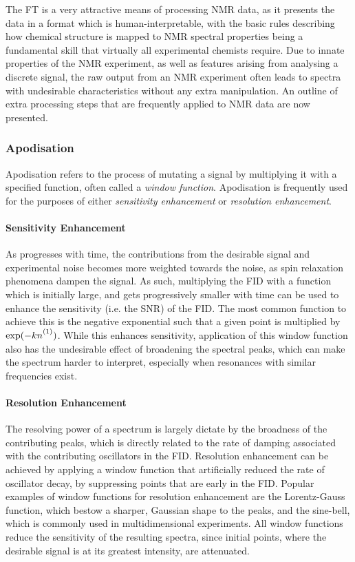 The \ac{FT} is a very attractive means of processing \ac{NMR} data, as it
presents the data in a format which is human-interpretable, with the basic
rules describing how chemical structure is mapped to \ac{NMR} spectral
properties being a fundamental skill that virtually all experimental chemists
require\cite{Hore2015b}. Due to innate properties of the \ac{NMR} experiment,
as well as features arising from analysing a discrete signal, the raw output
from an \ac{NMR} experiment often leads to spectra with undesirable
characteristics without any extra manipulation. An outline of extra processing
steps that are frequently applied to \ac{NMR} data are now presented.

\subsubsection{Apodisation}
Apodisation refers to the process of mutating a signal by multiplying it with a
specified function, often called a \emph{window function}. Apodisation is frequently used for the purposes of either \emph{sensitivity enhancement} or \emph{resolution enhancement}.

\paragraph{Sensitivity Enhancement} As  progresses with time, the
contributions from the desirable signal and experimental noise becomes more
weighted towards the noise, as spin relaxation phenomena dampen the signal. As
such, multiplying the \ac{FID} with a function which is initially large, and
gets progressively smaller with time can be used to enhance the sensitivity
(i.e. the \ac{SNR}) of the \ac{FID}. The most common function to achieve this
is the negative exponential such that a given point is multiplied by $\exp(-k
\none)$. While this enhances sensitivity, application of this window function
also has the undesirable effect of broadening the spectral peaks, which can
make the spectrum harder to interpret, especially when resonances with similar
frequencies exist.

\paragraph{Resolution Enhancement} The resolving power of a spectrum is largely
dictate by the broadness of the contributing peaks, which is directly related
to the rate of damping associated with the contributing oscillators in the
\ac{FID}. Resolution enhancement can be achieved by applying a window function
that artificially reduced the rate of oscillator decay, by suppressing points
that are early in the \ac{FID}. Popular examples of window functions for
resolution enhancement are the Lorentz-Gauss function, which bestow a sharper,
Gaussian shape to the peaks, and the sine-bell, which is commonly used in
multidimensional experiments. All window functions reduce the sensitivity of
the resulting spectra, since initial points, where the desirable signal is at
its greatest intensity, are attenuated.

